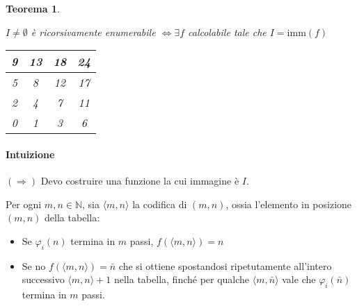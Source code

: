 \documentclass[a4paper,10pt,oneside]{article}
\theoremstyle{break}
\newtheorem{teo}{Teorema}[subsection]
\newcommand{\naturals}{\mathbb {N}}
\begin{document}
\begin{mdframed}

 \begin{teo}

 \begin{multicols}{2}
   $I \neq \emptyset$ è ricorsivamente enumerabile $\iff \exists f$ calcolabile tale che $I = \text{imm} (f)$
   
     \begin{center}
  \begin{tabular}{|c|c|c|c}

   9 & 13 & 18 & 24\\
   \hline
   5 & 8 & 12 & 17\\
   \hline
   2 & 4 & 7  & 11\\
   \hline
   0 & 1 & 3  & 6\\
   \hline
  \end{tabular}
  \end{center}
 \end{multicols}
  \end{teo}
 
 \paragraph{Intuizione} $(\Rightarrow)$
  Devo costruire una funzione la cui immagine è $I$. \smallskip

  Per ogni $m, n \in \naturals$, sia $\langle m, n \rangle$ la codifica di $(m, n)$, ossia l'elemento in posizione $(m, n)$ della tabella:
  \begin{itemize}
   \item Se $\varphi_i(n)$ termina in $m$ passi, $f(\langle m, n \rangle) = n$
   \item Se no $f(\langle m, n \rangle) = \bar n$ che si ottiene spostandosi ripetutamente all'intero successivo $\langle m, n \rangle + 1$ nella tabella, finché per qualche $\langle m, \bar n \rangle$ vale che $\varphi_i(\bar n)$ termina in $m$ passi.
  \end{itemize}


 \dotfill


\end{mdframed}
\end{document}
